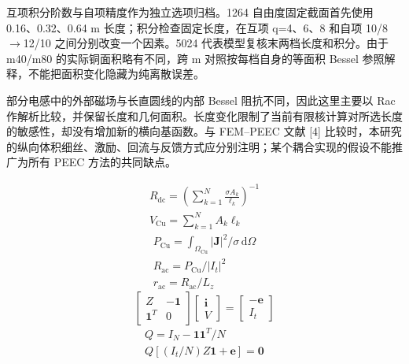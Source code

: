 \documentclass[11pt]{article}
\begin{document}
互项积分阶数与自项精度作为独立选项归档。1264 自由度固定截面首先使用 0.16、0.32、0.64 m 长度；积分检查固定长度，在互项 q=4、6、8 和自项 10/8\(\to\)12/10 之间分别改变一个因素。5024 代表模型复核末两档长度和积分。由于 m40/m80 的实际铜面积略有不同，跨 m 对照按每档自身的等面积 Bessel 参照解释，不能把面积变化隐藏为纯离散误差。


部分电感中的外部磁场与长直圆线的内部 Bessel 阻抗不同，因此这里主要以 Rac 作解析比较，并保留长度和几何面积。长度变化限制了当前有限核计算对所选长度的敏感性，却没有增加新的横向基函数。与 FEM–PEEC 文献 [4] 比较时，本研究的纵向体积细丝、激励、回流与反馈方式应分别注明；某个耦合实现的假设不能推广为所有 PEEC 方法的共同缺点。


\hypertarget{E01}{}
\begin{equation}
\begin{gathered}
R_{\mathrm{dc}}=\left(\sum_{k=1}^{N}\frac{\sigma A_k}{\ell_k}\right)^{-1} \\
V_{\mathrm{Cu}}=\sum_{k=1}^{N}A_k\ell_k
\end{gathered}
\tag{1}\label{eq:E01}
\end{equation}
\hypertarget{E02}{}
\begin{equation}
\begin{gathered}
P_{\mathrm{Cu}}=\int_{\Omega_{\mathrm{Cu}}}|\mathbf J|^2/\sigma\,\mathrm d\Omega \\
R_{\mathrm{ac}}=P_{\mathrm{Cu}}/|I_t|^2 \\
r_{\mathrm{ac}}=R_{\mathrm{ac}}/L_z
\end{gathered}
\tag{2}\label{eq:E02}
\end{equation}
\hypertarget{E04}{}\begin{equation}\begin{bmatrix} Z&-\mathbf1\\ \mathbf1^T&0\end{bmatrix}\begin{bmatrix}\mathbf i\\V\end{bmatrix}=\begin{bmatrix}-\mathbf e\\I_t\end{bmatrix}\tag{3}\label{eq:E04}\end{equation}
\hypertarget{E05}{}
\begin{equation}
\begin{gathered}
Q=I_N-\mathbf1\mathbf1^T/N \\
Q\left[(I_t/N)Z\mathbf1+\mathbf e\right]=\mathbf0
\end{gathered}
\tag{4}\label{eq:E05}
\end{equation}
\end{document}
